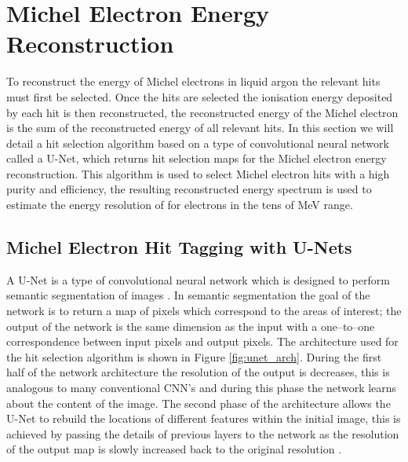 
\section{Michel Electron Energy Reconstruction} \label{ME_R} 

To reconstruct the energy of Michel electrons in liquid argon the relevant hits
must first be selected. Once the hits are selected the ionisation energy
deposited by each hit is then reconstructed, the reconstructed energy of the 
Michel electron is the sum of the reconstructed energy of all relevant hits. In
this section we will detail a hit selection algorithm based on a type of
convolutional neural network called a U-Net, which returns hit selection maps 
for the Michel electron energy reconstruction. This algorithm is used to select 
Michel electron hits with a high purity and efficiency, the resulting 
reconstructed energy spectrum is used to estimate the energy resolution of 
\protodune{} for electrons in the tens of MeV range.

\subsection{Michel Electron Hit Tagging with U-Nets}

A U-Net is a type of convolutional neural network which is designed to perform
semantic segmentation of images \cite{TODO}. In semantic segmentation the goal
of the network is to return a map of pixels which correspond to the areas of 
interest; the output of the network is the same dimension as the input with a 
one--to--one correspondence between input pixels and output pixels. The
architecture used for the hit selection algorithm is shown in Figure
\ref{fig:unet_arch}. During the first half of the network architecture the
resolution of the output is decreases, this is analogous to many conventional
CNN's and during this phase the network learns about the content of the image.
The second phase of the architecture allows the U-Net to rebuild the locations 
of different features within the initial image, this is achieved by passing 
the details of previous layers to the network as the resolution of the output 
map is slowly increased back to the original resolution \cite{TODO}. 

